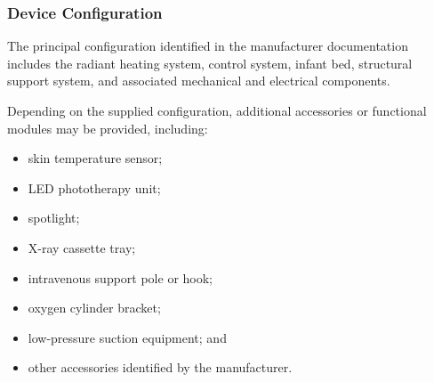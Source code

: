 \subsubsection{Device Configuration}

The principal configuration identified in the manufacturer
documentation includes the radiant heating system, control
system, infant bed, structural support system, and associated
mechanical and electrical components.

Depending on the supplied configuration, additional
accessories or functional modules may be provided, including:

\begin{itemize}
    \item skin temperature sensor;
    \item LED phototherapy unit;
    \item spotlight;
    \item X-ray cassette tray;
    \item intravenous support pole or hook;
    \item oxygen cylinder bracket;
    \item low-pressure suction equipment; and
    \item other accessories identified by the manufacturer.
\end{itemize}

